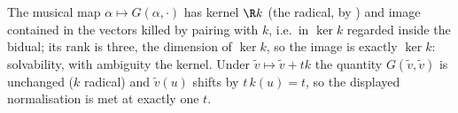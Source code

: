 The musical map $\alpha \mapsto G(\alpha, \cdot)$ has kernel $\R k$ (the radical, by ) and image contained in the vectors killed by pairing with $k$, i.e.\ in $\ker k$ regarded inside the bidual; its rank is three, the dimension of $\ker k$, so the image is exactly $\ker k$: solvability, with ambiguity the kernel. Under $\tilde v \mapsto \tilde v + tk$ the quantity $G(\tilde v, \tilde v)$ is unchanged ($k$ radical) and $\tilde v(u)$ shifts by $t\,k(u) = t$, so the displayed normalisation is met at exactly one $t$.
